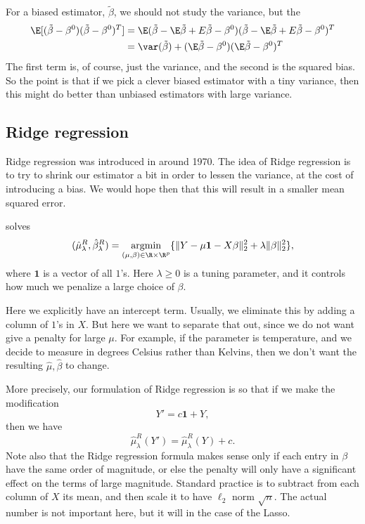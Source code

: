 \documentclass[a4paper]{article}
\DeclareMathOperator*\argmin{argmin}
\begin{document}
For a biased estimator, $\tilde{\beta}$, we should not study the variance, but the 
\begin{align*}
  \E[(\tilde{\beta} - \beta^0)(\tilde{\beta} - \beta^0)^T]
  &= \E(\tilde{\beta} - \E \tilde{\beta} + E \tilde{\beta} - \beta^0)(\tilde{\beta} - \E \tilde{\beta} + E \tilde{\beta} - \beta^0)^T \\ &= \var(\tilde{\beta})+ (\E \tilde{\beta} - \beta^0)(\E \tilde{\beta} - \beta^0)^T
\end{align*}
The first term is, of course, just the variance, and the second is the squared bias. So the point is that if we pick a clever biased estimator with a tiny variance, then this might do better than unbiased estimators with large variance.

\subsection{Ridge regression}
Ridge regression was introduced in around 1970. The idea of Ridge regression is to try to shrink our estimator a bit in order to lessen the variance, at the cost of introducing a bias. We would hope then that this will result in a smaller mean squared error.

\begin{defi}
   solves
  \[
    (\hat{\mu}^R_\lambda, \hat{\beta}^R_\lambda) = \argmin_{(\mu, \beta) \in \R \times \R^p} \{ \|Y - \mu \mathbf{1} - X \beta\|_2^2 + \lambda \|\beta\|_2^2\},
  \]
  where $\mathbf{1}$ is a vector of all $1$'s. Here $\lambda \geq 0$ is a tuning parameter, and it controls how much we penalize a large choice of $\beta$.
\end{defi}

Here we explicitly have an intercept term. Usually, we eliminate this by adding a column of $1$'s in $X$. But here we want to separate that out, since we do not want give a penalty for large $\mu$. For example, if the parameter is temperature, and we decide to measure in degrees Celsius rather than Kelvins, then we don't want the resulting $\hat{\mu}, \hat{\beta}$ to change.

More precisely, our formulation of Ridge regression is so that if we make the modification
\[
  Y' = c\mathbf{1} + Y,
\]
then we have
\[
  \hat{\mu}^R_\lambda(Y') = \hat{\mu}_\lambda^R(Y) + c.
\]
Note also that the Ridge regression formula makes sense only if each entry in $\beta$ have the same order of magnitude, or else the penalty will only have a significant effect on the terms of large magnitude. Standard practice is to subtract from each column of $X$ its mean, and then scale it to have $\ell_2$ norm $\sqrt{n}$. The actual number is not important here, but it will in the case of the Lasso.
\end{document}
